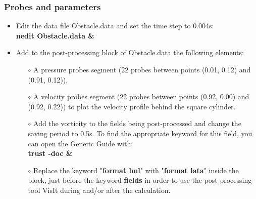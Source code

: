 \documentclass[10pt, hyperref={unicode=true,pdfusetitle, bookmarks=true,bookmarksnumbered=false,bookmarksopen=false, breaklinks=false,pdfborder={0 0 1},backref=true,colorlinks=true,linkcolor=darkblue,pageanchor}]{beamer}
\begin{document}
\begin{frame}
\frametitle{Probes and parameters}
\begin{block}{}

\begin{itemize}
\item Edit the data file Obstacle.data and set the time step to 0.004s:\\
\textbf{nedit Obstacle.data \&}\\

\item Add to the post-processing block of Obstacle.data the following elements:\\

    \begin{itemize}
    \item [$\circ$] A pressure probes segment (22 probes between points (0.01, 0.12) and (0.91, 0.12)).
    \vspace{0.1cm}

    \item [$\circ$] A velocity probes segment (22 probes between points (0.92, 0.00) and (0.92, 0.22)) to plot the velocity profile behind the square cylinder.
    \vspace{0.1cm}

    \item [$\circ$] Add the vorticity to the fields being post-processed and change the saving period to 0.5s. To find the appropriate keyword for this field, you can open the Generic Guide with:\\
    \textbf{trust -doc \&}
    \vspace{0.1cm}

    \item [$\circ$] Replace the keyword "\textbf{format lml}" with "\textbf{format lata}" inside the block, just before the keyword \textbf{fields} in order to use the post-processing tool VisIt during and/or after the calculation.
    \vspace{0.1cm}
    \end{itemize}
\end{itemize}

\end{block}
\end{frame}
\end{document}
